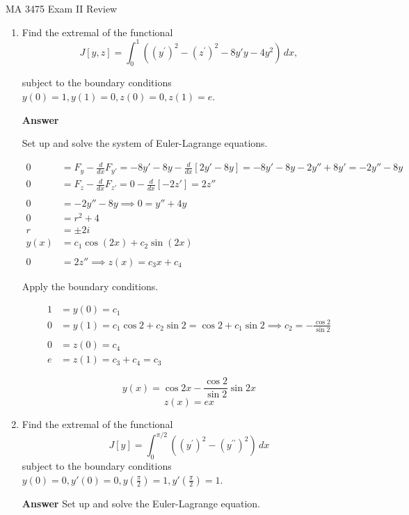 \documentclass[12pt]{article}
\begin{document}
\noindent MA 3475\,\,Exam II Review 


\begin{enumerate}
\item Find the extremal of the functional
$$
J[y,z] = \int_0^1 \left((y^{\prime})^2 - (z^{\prime})^2 - 8y'y -4 y^2 \right)\,dx,
$$

subject to the boundary conditions $y(0) = 1, y(1)=  0, z(0) = 0, z(1) = e$.

{\bf Answer}

Set up and solve the system of Euler-Lagrange equations.

\begin{align*}
0 &= F_y - \frac{d}{dx}F_{y'} = -8y' -8y - \frac{d}{dx}[2y' - 8y] = -8y' - 8y - 2y'' + 8y' = -2y'' - 8y \\
0 &= F_z - \frac{d}{dx}F_{z'} = 0 - \frac{d}{dx}[-2z'] = 2z'' \\
& \\
0 &= -2y'' - 8y \implies 0 = y'' + 4y \\
0 &= r^2 + 4 \\
r &= \pm 2 i \\
y(x) &= c_1\cos(2x) + c_2 \sin(2x) \\
& \\
0 &= 2z'' \implies z(x) = c_3x + c_4
\end{align*}

Apply the boundary conditions.

\begin{align*}
1 &= y(0) = c_1 \\
0 &= y(1) = c_1\cos 2 + c_2 \sin 2 = \cos 2 + c_1 \sin 2 \implies c_2 = -\frac{\cos 2}{\sin 2} \\
& \\
0 &= z(0) = c_4 \\
e &= z(1) = c_3 + c_4 = c_3
\end{align*}

$$\boxed{y(x) = \cos 2x  -\frac{\cos 2}{\sin 2} \sin 2x} $$
$$\boxed{z(x) = ex }$$

\newpage


\item Find the extremal of the functional
$$
J[y] = \int_0^{\pi/2} \left((y^{\prime})^2 - (y^{\prime\prime})^2 \right) \,dx
$$
subject to the boundary conditions $y(0) = 0, y'(0) = 0, y\left(\frac{\pi}{2}\right) = 1, y'\left(\frac{\pi}{2}\right) = 1$.

{\bf Answer} Set up and solve the Euler-Lagrange equation.


\end{enumerate}
\end{document}
